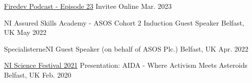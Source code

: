 
\begin{cvminortalks}


   \cvminortalk
    {\href{https://podcasters.spotify.com/pod/show/firedev/episodes/FireDEV-23---Dominik-Kiersz-Programmer-For-One-Of-the-UKs-Largest-Online-Retailers-ASOS-e1tvvvr}{Firedev Podcast - Episode 23}}
    {Invitee}
    {Online} %
    {Mar. 2023} %
    
    \cvminortalk
   	{NI Assured Skills Academy - ASOS Cohort 2 Induction}
    {Guest Speaker}
    {Belfast, UK} %
    {May 2022} %
    
    \cvminortalk
   	{SpecialisterneNI}
    {Guest Speaker (on behalf of ASOS Plc.)}
    {Belfast, UK} %
    {Apr. 2022} %
   
    \cvminortalk
   	{\href{https://kiersz.dev/resources/aida-presentation.pdf}{NI Science Festival 2021}}
    {Presentation: AIDA - Where Activism Meets Asteroids}
    {Belfast, UK} %
    {Feb. 2020} %
   

\end{cvminortalks}